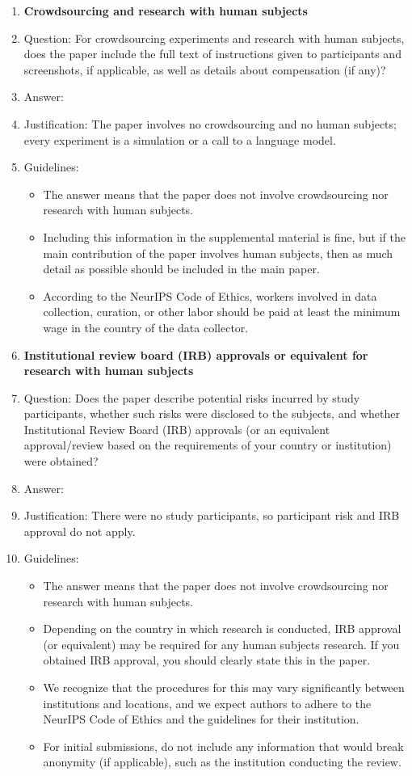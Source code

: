 \begin{enumerate}
\item {\bf Crowdsourcing and research with human subjects}
    \item[] Question: For crowdsourcing experiments and research with human subjects, does the paper include the full text of instructions given to participants and screenshots, if applicable, as well as details about compensation (if any)?
    \item[] Answer: \answerNA{}
    \item[] Justification: The paper involves no crowdsourcing and no human subjects; every experiment is a simulation or a call to a language model.
    \item[] Guidelines:
    \begin{itemize}
        \item The answer \answerNA{} means that the paper does not involve crowdsourcing nor research with human subjects.
        \item Including this information in the supplemental material is fine, but if the main contribution of the paper involves human subjects, then as much detail as possible should be included in the main paper.
        \item According to the NeurIPS Code of Ethics, workers involved in data collection, curation, or other labor should be paid at least the minimum wage in the country of the data collector.
    \end{itemize}

\item {\bf Institutional review board (IRB) approvals or equivalent for research with human subjects}
    \item[] Question: Does the paper describe potential risks incurred by study participants, whether such risks were disclosed to the subjects, and whether Institutional Review Board (IRB) approvals (or an equivalent approval/review based on the requirements of your country or institution) were obtained?
    \item[] Answer: \answerNA{}
    \item[] Justification: There were no study participants, so participant risk and IRB approval do not apply.
    \item[] Guidelines:
    \begin{itemize}
        \item The answer \answerNA{} means that the paper does not involve crowdsourcing nor research with human subjects.
        \item Depending on the country in which research is conducted, IRB approval (or equivalent) may be required for any human subjects research. If you obtained IRB approval, you should clearly state this in the paper.
        \item We recognize that the procedures for this may vary significantly between institutions and locations, and we expect authors to adhere to the NeurIPS Code of Ethics and the guidelines for their institution.
        \item For initial submissions, do not include any information that would break anonymity (if applicable), such as the institution conducting the review.
    \end{itemize}


\end{enumerate}
